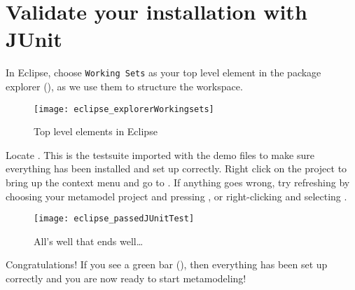 \clearpage
\genHeader
\hypertarget{validate common}{} 
\section{Validate your installation with JUnit}

\begin{stepbystep}

\item  In Eclipse, choose \texttt{Working Sets} as your top level element in the package explorer (), as we use them to structure the workspace.

\begin{figure}[htbp]
	\centering
  \texttt{[image: eclipse\_explorerWorkingsets]}
	\caption{Top level elements in Eclipse}
	\label{eclipse:topLevel}
\end{figure}

\item 
Locate .
This is the testsuite imported with the demo files to make sure everything has been installed and set up correctly.
Right click on the project to bring up the context menu and go to .
If anything goes wrong, try refreshing by choosing your metamodel project and pressing , or right-clicking and selecting .

\begin{figure}[htbp]
	\centering
  \texttt{[image: eclipse\_passedJUnitTest]}
	\caption{All's well that ends well\ldots}
	\label{eclipse:passedTest}
\end{figure}

\vspace{0.5cm}

Congratulations!
If you see a green bar (), then everything has been set up correctly and you are now ready to start metamodeling!

\end{stepbystep}